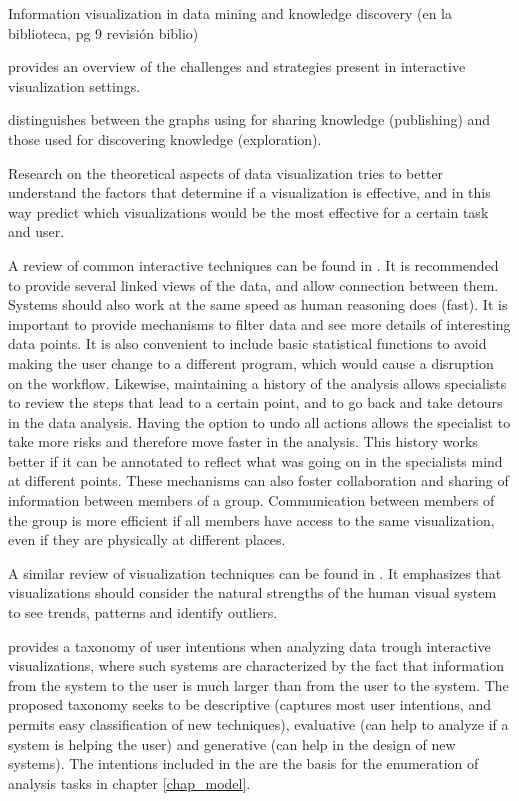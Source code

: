 \autocite{fayyad_information_2002}	Information visualization in data mining and knowledge discovery (en la biblioteca, pg 9 revisión biblio)

\autocite{spence_information_2007} provides an overview of the challenges and strategies present in interactive visualization settings.
	
\autocite{card_structure_1997}	distinguishes between the graphs using for sharing knowledge (publishing) and those used for discovering knowledge (exploration). 


Research on the theoretical aspects of data visualization \autocite{purchase_theoretical_2008} tries to better understand the factors that determine if a visualization is effective, and in this way predict which visualizations would be the most effective for a certain task and user.
	

A review of common interactive techniques can be found in \autocite{heer_interactive_2012}. It is recommended to provide several linked views of the data, and allow connection between them. Systems should also work at the same speed as human reasoning does (fast). It is important to provide mechanisms to filter data and see more details of interesting data points. It is also convenient to include basic statistical functions to avoid making the user change to a different program, which would cause a disruption on the workflow. Likewise, maintaining a history of the analysis allows specialists to review the steps that lead to a certain point, and to go back and take detours in the data analysis. Having the option to undo all actions allows the specialist to take more risks and therefore move faster in the analysis. This history works better if it can be annotated to reflect what was going on in the specialists mind at different points. These mechanisms can also foster collaboration and sharing of information between members of a group. Communication between members of the group is more efficient if all members have access to the same visualization, even if they are physically at different places.

A similar review of visualization techniques can be found in \autocite{heer_tour_2010}. It emphasizes that visualizations should consider the natural strengths of the human visual system to see trends, patterns and identify outliers.



\autocite{yi_toward_2007} provides a taxonomy of user intentions when analyzing data trough interactive visualizations, where such systems are characterized by the fact that information from the system to the user is much larger than from the user to the system. The proposed taxonomy seeks to be descriptive (captures most user intentions, and permits easy classification of new techniques), evaluative (can help to analyze if a system is helping the user) and generative (can help in the design of new systems). The intentions included in the are the basis for the enumeration of analysis tasks in chapter \ref{chap_model}.


